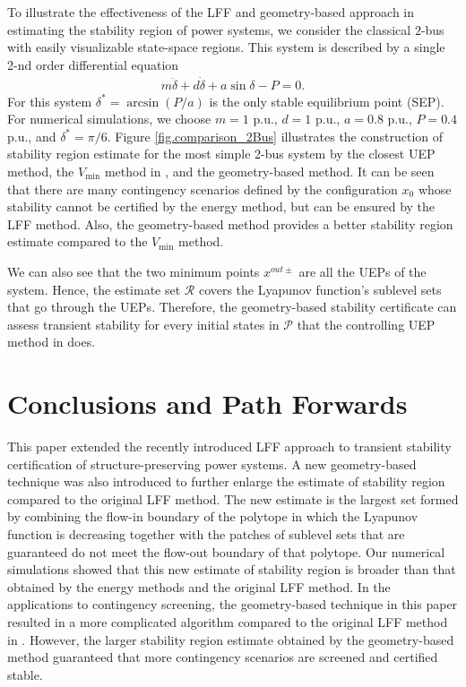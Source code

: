 \documentclass[final]{IEEEtran}
\begin{document}
To illustrate the effectiveness of the LFF and geometry-based approach in estimating the stability region of power systems, we consider the classical $2$-bus with easily visualizable
state-space regions. This system is described by a single 2-nd
order differential equation
\begin{align}
  m \ddot{\delta} +d \dot{\delta} + a \sin\delta - P=0.
\end{align}
For this system $\delta^*=\arcsin(P/a)$ is the only stable
equilibrium point (SEP). For numerical simulations, we choose
$m=1$ p.u., $d=1$ p.u., $a= 0.8$ p.u., $P=0.4$ p.u., and
$\delta^*=\pi/6.$ Figure \ref{fig.comparison_2Bus} illustrates the construction of stability region estimate for the most simple 2-bus system by the closest UEP method, the $V_{\min}$ method in \cite{Vu:2014},
and the geometry-based method. It can be seen that there are many
contingency scenarios defined by the configuration $x_0$ whose
stability cannot be certified by the energy method, but
can be ensured by the LFF method. Also, the geometry-based method provides a better stability region estimate 
compared to the $V_{\min}$ method.

We can also see that the two minimum points $x^{out\pm}$ are all the UEPs of the system. Hence, the estimate set $\mathcal{R}$ covers the Lyapunov function's sublevel sets that go through the UEPs. Therefore, the geometry-based stability certificate can assess transient stability for every initial states in $\mathcal{P}$ that the controlling UEP method in \cite{Zou:2003ji} does.

\section{Conclusions and Path Forwards}
\label{sec:discussion}
This paper extended the recently introduced LFF approach to transient stability certification of structure-preserving power systems.
A new geometry-based technique was also introduced to further enlarge the estimate of stability region compared to the original LFF method. The new estimate is the largest set formed by combining the flow-in boundary of the polytope in which the Lyapunov function is decreasing together  with the patches of sublevel sets that are guaranteed do not meet the flow-out boundary of that polytope.
Our numerical simulations showed that this new estimate of stability region is broader than that obtained by
 the energy methods and the original LFF method. In the applications to contingency screening,
the geometry-based technique in this paper resulted in a more complicated algorithm compared to the original LFF method in \cite{Vu:2014}.
However, the larger stability region estimate obtained by the geometry-based method guaranteed that more contingency scenarios are screened and certified stable.
\end{document}
